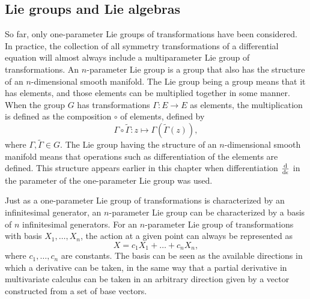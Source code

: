 \subsection{Lie groups and Lie algebras}

So far, only one-parameter Lie groups of transformations have been considered.
In practice, the collection of all symmetry transformations of a differential equation will almost always include a multiparameter Lie group of transformations.
An \(n\)-parameter Lie group is a group that also has the structure of an \(n\)-dimensional smooth manifold.
The Lie group being a group means that it has elements, and those elements can be multiplied together in some manner.
When the group \(G\) has transformations \(\Gamma: E \to E\) as elements, the multiplication is defined as the composition \(\circ\) of elements, defined by
\begin{equation}
  \Gamma \circ \tilde{\Gamma}: z \mapsto \Gamma\left(\tilde{\Gamma}(z)\right),
\end{equation}
where \(\Gamma, \tilde{\Gamma} \in G\).
The Lie group having the structure of an \(n\)-dimensional smooth manifold means that operations such as differentiation of the elements are defined.
This structure appears earlier in this chapter when differentiation \(\diff*{}{\epsilon}\) in the parameter of the one-parameter Lie group was used.

Just as a one-parameter Lie group of transformations is characterized by an infinitesimal generator, an \(n\)-parameter Lie group can be characterized by a basis of \(n\) infinitesimal generators.
For an \(n\)-parameter Lie group of transformations with basis \(X_1, \dots, X_n\), the action at a given point can always be represented as
\begin{equation*}
  X = c_1 X_1 + \dots + c_n X_n,
\end{equation*}
where \(c_1, \dots, c_n\) are constants.
The basis can be seen as the available directions in which a derivative can be taken, in the same way that a partial derivative in multivariate calculus can be taken in an arbitrary direction given by a vector constructed from a set of base vectors.

